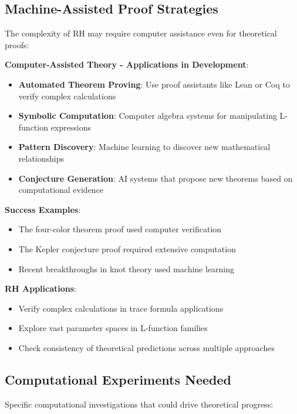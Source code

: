 \subsection{Machine-Assisted Proof Strategies}
\label{subsec:machine_assisted}

The complexity of RH may require computer assistance even for theoretical proofs:

\noindent\textbf{Computer-Assisted Theory - Applications in Development}:
\begin{itemize}
\item \textbf{Automated Theorem Proving}: Use proof assistants like Lean or Coq to verify complex calculations
\item \textbf{Symbolic Computation}: Computer algebra systems for manipulating L-function expressions
\item \textbf{Pattern Discovery}: Machine learning to discover new mathematical relationships
\item \textbf{Conjecture Generation}: AI systems that propose new theorems based on computational evidence
\end{itemize}

\textbf{Success Examples}:
\begin{itemize}
\item The four-color theorem proof used computer verification
\item The Kepler conjecture proof required extensive computation
\item Recent breakthroughs in knot theory used machine learning
\end{itemize}

\textbf{RH Applications}:
\begin{itemize}
\item Verify complex calculations in trace formula applications
\item Explore vast parameter spaces in L-function families
\item Check consistency of theoretical predictions across multiple approaches
\end{itemize}

\subsection{Computational Experiments Needed}
\label{subsec:computational_experiments}

Specific computational investigations that could drive theoretical progress:

